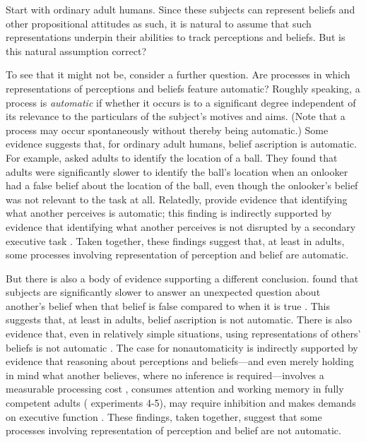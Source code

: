 \documentclass[12pt,\papersize]{extarticle}
\begin{document}
Start with ordinary adult humans.
Since these subjects can represent beliefs and other propositional attitudes as such, 
it is natural to assume that such representations underpin their abilities to track perceptions and beliefs.
But is this natural assumption correct?

To see that it might not be, consider a further question.
Are processes in which representations of perceptions and beliefs feature automatic?
Roughly speaking,
a process is \emph{automatic} if whether it occurs is to a significant degree independent of its relevance to the particulars of the subject's motives and aims.
(Note that a process may occur spontaneously without thereby being automatic.)  
Some evidence suggests that, for ordinary adult humans, belief ascription is automatic.
For example,
\citet{kovacs_social_2010} asked adults to identify the location of a ball.
They found that adults were significantly slower to identify the ball's location when an onlooker had a false belief about the location of the ball,
even though the onlooker's belief was not relevant to the task at all.
Relatedly, \citet{Samson:2010jm} provide evidence that identifying what another perceives is automatic;  this finding is indirectly supported by  evidence that identifying what another perceives is not disrupted by a secondary executive task \citep{qureshi:2010_executive}.
Taken together, these findings suggest that, at least in adults, some processes involving representation of perception and belief are automatic.

But there is also a body of evidence supporting a different conclusion.
\citet{back:2010_apperly} found that subjects are significantly slower to answer an unexpected question about another's belief when that belief is false compared to when it is true \citep[see also][]{apperly:2006_belief}.
This suggests that, at least in adults, belief ascription is not automatic.
There is also evidence that, even in relatively simple situations, using representations of others' beliefs is not automatic \citep{Keysar:2003xu,apperly:2010_limits}.
The case for nonautomaticity is indirectly supported by evidence that reasoning about perceptions and beliefs---and even merely holding in mind what another believes, where no inference is required---involves a measurable processing cost  \citep{apperly:2008_back,apperly:2010_limits}, consumes attention and working memory in fully competent adults (\citealp{en_1698, lin:2010_reflexively, en_1547} experiments 4-5), may require inhibition \citep{bull:2008_role} and makes demands on executive function \citep{apperly:2004_frontal,samson:2005_seeing}.
These findings, taken together, suggest that some processes involving representation of perception and belief are not automatic.
\end{document}
